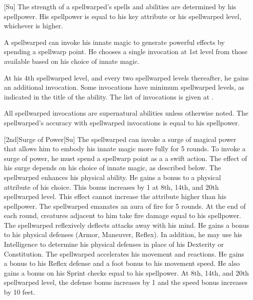 [Su]
The strength of a spellwarped's spells and abilities are determined by his spellpower.
His spellpower is equal to his key attribute or his spellwarped level, whichever is higher.

A spellwarped can invoke his innate magic to generate powerful effects by spending a spellwarp point.
He chooses a single invocation at 1st level from those available based on his choice of innate magic.

At his 4th spellwarped level, and every two spellwarped levels thereafter, he gains an additional invocation.
Some invocations have minimum spellwarped levels, as indicated in the title of the ability.
The list of invocations is given at .

All spellwarped invocations are supernatural abilities unless otherwise noted.
The spellwarped's accuracy with spellwarped invocations is equal to his spellpower.

[2nd]{Surge of Power}[Su]
The spellwarped can invoke a surge of magical power that allows him to embody his innate magic more fully for 5 rounds.
To invoke a surge of power, he must spend a spellwarp point as a a swift action.
The effect of his surge depends on his choice of innate magic, as described below.
The spellwarped enhances his physical ability.
He gains a  bonus to a physical attribute of his choice.
This bonus increases by 1 at 8th, 14th, and 20th spellwarped level.
This effect cannot increase the attribute higher than his spellpower.
The spellwarped emanates an aura of fire for 5 rounds.
At the end of each round, creatures adjacent to him take fire damage equal to his spellpower.
The spellwarped reflexively deflects attacks away with his mind.
He gains a  bonus to his physical defenses (Armor, Maneuver, Reflex).
In addition, he may use his Intelligence to determine his physical defenses in place of his Dexterity or Constitution.
The spellwarped accelerates his movement and reactions.
He gains a  bonus to his Reflex defense and a  foot bonus to his movement speed.
He also gains a bonus on his Sprint checks equal to his spellpower.
At 8th, 14th, and 20th spellwarped level, the defense bonus increases by 1 and the speed bonus increases by 10 feet.

